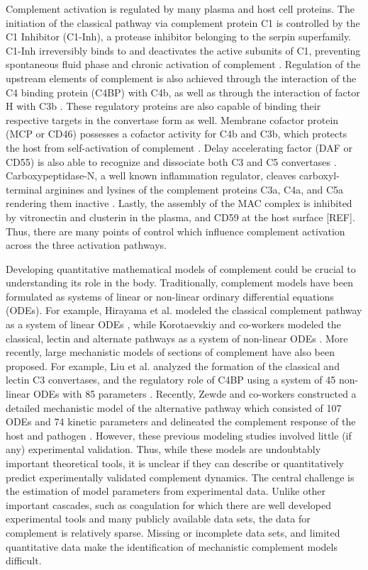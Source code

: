 \documentclass[12pt]{article}
\begin{document}
Complement activation is regulated by many plasma and host cell proteins.
The initiation of the classical pathway via complement protein C1 is controlled by the C1 Inhibitor (C1-Inh), a protease inhibitor belonging to the serpin superfamily.
C1-Inh irreversibly binds to and deactivates the active subunits of C1, preventing spontaneous fluid phase and chronic activation of complement \cite{walker1995complement}.
Regulation of the upstream elements of complement is also achieved through the interaction of the C4 binding protein (C4BP) with C4b, as well as
through the interaction of factor H with C3b \cite{blom2001structural}.
These regulatory proteins are also capable of binding their respective targets in the convertase form as well.
Membrane cofactor protein (MCP or CD46) possesses a cofactor activity for C4b and C3b, which protects the host from self-activation of complement \cite{riley2004cd46}.
Delay accelerating factor (DAF or CD55) is also able to recognize and dissociate both C3 and C5 convertases \cite{lukacik2004complement}.
Carboxypeptidase-N, a well known inflammation regulator, cleaves carboxyl-terminal arginines and lysines of the complement proteins C3a, C4a, and C5a rendering them inactive \cite{liszewski1995control}. Lastly, the assembly of the MAC complex is inhibited by vitronectin and clusterin in the plasma, and CD59 at the host surface [REF].
Thus, there are many points of control which influence complement activation across the three activation pathways.

Developing quantitative mathematical models of complement could be crucial to understanding its role in the body.
Traditionally, complement models have been formulated as systems of linear or non-linear ordinary differential equations (ODEs).
For example, Hirayama et al. modeled the classical complement pathway as a system of linear ODEs \cite{hirayama1996linear},
while Korotaevskiy and co-workers modeled the classical, lectin and alternate pathways as a system of non-linear ODEs \cite{korotaevskiy2009non}.
More recently, large mechanistic models of sections of complement have also been proposed.
For example, Liu et al. analyzed the formation of the classical and lectin C3 convertases, and the regulatory role of C4BP using a system of 45 non-linear ODEs with 85 parameters \cite{liu2011computational}.
Recently, Zewde and co-workers constructed a detailed mechanistic model of the alternative pathway which consisted of 107 ODEs and 74 kinetic parameters and delineated
the complement response of the host and pathogen \cite{zewde2016quantitative}.
However, these previous modeling studies involved little (if any) experimental validation.
Thus, while these models are undoubtably important theoretical tools, it is unclear if they can describe or quantitatively predict experimentally validated complement dynamics.
The central challenge is the estimation of model parameters from experimental data.
Unlike other important cascades, such as coagulation for which there are well developed experimental tools and many publicly available data sets,
the data for complement is relatively sparse. Missing or incomplete data sets, and limited quantitative data make the identification of mechanistic complement models difficult.
\end{document}
